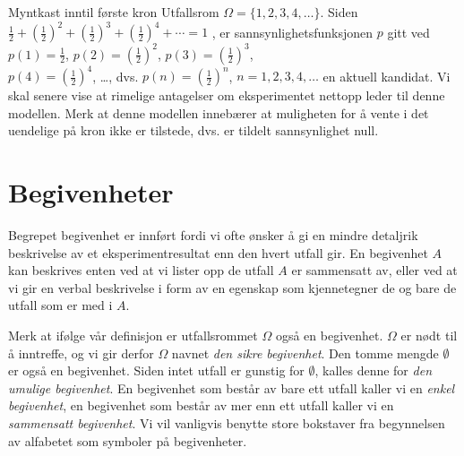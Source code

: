 \begin{eksempel}{Myntkast inntil første kron}
Utfallsrom $\Omega =\{1,2,3,4,\ldots   \}$. Siden
${\frac{1}{2}}+{(\frac{1}{2})}^2+{(\frac{1}{2})}^3+{(\frac{1}{2})}^4+\cdots 
=1$ , er sannsynlighetsfunksjonen $p$ gitt ved $p(1)={\frac{1}{2}}$,
$p(2)={(\frac{1}{2})}^2$, $p(3)={(\frac{1}{2})}^3$,\\ $p(4)={(\frac{1}{2})}^4$,
 \ldots , dvs. $p(n)={(\frac{1}{2})}^n$, $n=1,2,3,4, \ldots$ en aktuell
kandidat. Vi skal senere vise
at rimelige antagelser om eksperimentet nettopp leder til denne
modellen. Merk at denne modellen innebærer at muligheten for å
vente i det uendelige på kron ikke er tilstede, dvs. er tildelt
sannsynlighet null.
\end{eksempel}

\section{Begivenheter}

\begin{center}  \end{center}
Begrepet begivenhet er innført fordi vi ofte ønsker å gi en
mindre detaljrik beskrivelse av et eksperimentresultat enn den
hvert utfall gir.  En begivenhet $A$
kan beskrives enten ved at vi lister opp de utfall $A$ er
sammensatt av, eller ved at vi gir en verbal beskrivelse i form
av en egenskap som kjennetegner de og bare de utfall som er med i $A$.

Merk at ifølge vår definisjon er utfallsrommet $\Omega$ også
en begivenhet. $\Omega$ er nødt til å inntreffe, og vi gir derfor
$\Omega$ navnet {\em den sikre begivenhet}. Den tomme mengde
$\emptyset$ er også en begivenhet. Siden intet utfall er gunstig for
$\emptyset$, kalles denne for {\em den umulige begivenhet}. En
begivenhet som består av bare ett utfall kaller vi en {\em enkel
begivenhet}, en begivenhet som består av mer enn ett utfall kaller
vi en {\em sammensatt begivenhet}. Vi vil vanligvis benytte store bokstaver
 fra begynnelsen av alfabetet som symboler  på begivenheter.\\

